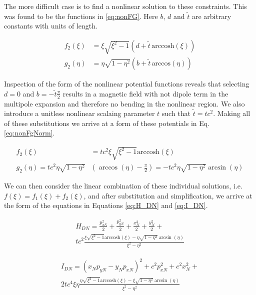 The more difficult case is to find a nonlinear solution to these constraints. This was found to be the functions in \ref{eq:nonFG}. Here $b$, $d$ and $\tilde{t}$ are arbitrary constants with units of length.

\begin{equation} \label{eq:nonFG}
\begin{split}
	f_2(\xi) &= \xi \sqrt{\xi^2 -1}(d + \tilde{t} \hspace{2pt} \textrm{arccosh}(\xi)) \\
	g_2(\eta) &= \eta \sqrt{1-\eta^2}(b + \tilde{t} \hspace{2pt} \textrm{arccos}(\eta))
\end{split}
\end{equation}

Inspection of the form of the nonlinear potential functions reveals that selecting $d=0$ and $b=-\tilde{t}\frac{\pi}{2}$ results in a magnetic field with not dipole term in the multipole expansion and therefore no bending in the nonlinear region. We also introduce a unitless nonlinear scalaing parameter $t$ such that $\tilde{t} = tc^2$. Making all of these substitutions we arrive at a form of these potentials in Eq. \ref{eq:nonFgNorm}.

\begin{equation} \label{eq:nonFgNorm}
\begin{split}
	f_2(\xi) &= t c^2 \xi \sqrt{\xi^2 -1} \textrm{arccosh}(\xi) \\
	g_2(\eta) = t c^2 \eta \sqrt{1-\eta^2}&\left(\arccos{(\eta) - \frac{\pi}{2}}\right) = -t c^2 \eta \sqrt{1-\eta^2}\arcsin{(\eta)}
\end{split}
\end{equation}

We can then consider the linear combination of these individual solutions, i.e. $f(\xi) = f_1(\xi)+f_2(\xi)$, and after substitution and simplification, we arrive at the form of the equations in Equations \ref{eq:H_DN} and \ref{eq:I_DN}.

\begin{multline} \label{eq:H_DN}
	H_{DN} = \frac{p_{xN}^2}{2} + \frac{p_{yN}^2}{2}  + \frac{x_{N}^2}{2} + \frac{y_{N}^2}{2} +\\
	tc^2 \frac{\xi \sqrt{\xi^2 -1} \textrm{arccosh}(\xi) - \eta \sqrt{1-\eta^2}\arcsin{(\eta)}}{\xi^2 - \eta^2} 
\end{multline}

\begin{multline} \label{eq:I_DN}
	I_{DN} = (x_N p_{yN} - y_N p_{xN})^2 + c^2 p_{xN}^2 + c^2 x_N^2 +\\ 
	2t c^4 \xi \eta \frac{\eta\sqrt{\xi^2 -1} \textrm{arccosh}(\xi) - \xi \sqrt{1-\eta^2}\arcsin{(\eta)}}{\xi^2 - \eta^2}
\end{multline}

